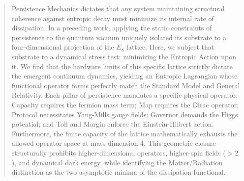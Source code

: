 \begin{abstract}
Persistence Mechanics dictates that any system maintaining structural coherence against entropic decay must minimize its internal rate of dissipation. In a preceding work, applying the static constraints of persistence to the quantum vacuum uniquely isolated its substrate to a four-dimensional projection of the $E_8$ lattice. Here, we subject that substrate to a dynamical stress test: minimizing the Entropic Action upon it. We find that the hardware limits of this specific lattice strictly dictate the emergent continuum dynamics, yielding an Entropic Lagrangian whose functional operator forms perfectly match the Standard Model and General Relativity. Each pillar of persistence mandates a specific physical operator: Capacity requires the fermion mass term; Map requires the Dirac operator; Protocol necessitates Yang-Mills gauge fields; Governor demands the Higgs potential; and Toll and Margin enforce the Einstein-Hilbert action. Furthermore, the finite capacity of the lattice mathematically exhausts the allowed operator space at mass dimension 4. This geometric closure structurally prohibits higher-dimensional operators, higher-spin fields ($>2$), and dynamical dark energy, while identifying the Matter/Radiation distinction as the two asymptotic minima of the dissipation functional.
\end{abstract}
